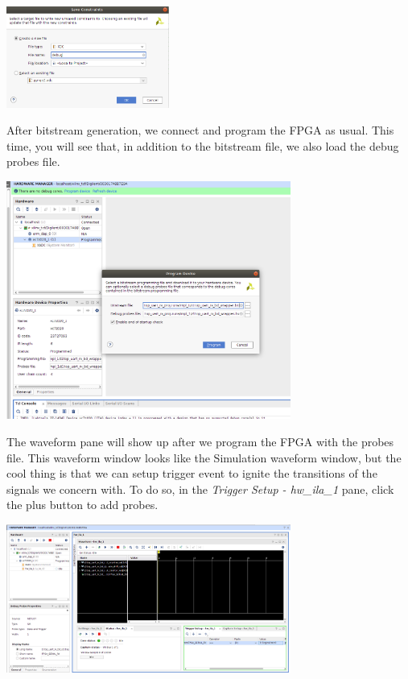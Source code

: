 \documentclass[11pt]{article}
\begin{document}
\begin{center}
\includegraphics[width=0.4\textwidth]{figs/vivado-ila-4.png}
\end{center}

After bitstream generation, we connect and program the FPGA as usual. This time, you will see that, in addition to the bitstream file, we also load the debug probes file.

\begin{center}
\includegraphics[width=0.7\textwidth]{figs/vivado-ila-5.png}
\end{center}

The waveform pane will show up after we program the FPGA with the probes file. This waveform window looks like the Simulation waveform window, but the cool thing is that we can setup trigger event to ignite the transitions of the signals we concern with. To do so, in the \emph{Trigger Setup - hw\_ila\_1} pane, click the plus button to add probes.

\begin{center}
\includegraphics[width=0.7\textwidth]{figs/vivado-ila-7.png}
\end{center}
\end{document}
